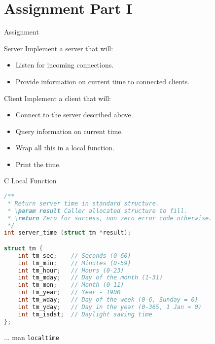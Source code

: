 \section{Assignment Part I}


\begin{frame}{Assignment}
    \begin{block}{Server}
        Implement a server that will:
        \begin{itemize}
            \item Listen for incoming connections.
            \item Provide information on current time to connected clients.
        \end{itemize}
    \end{block}

    \bigskip

    \begin{block}{Client}
        Implement a client that will:
        \begin{itemize}
            \item Connect to the server described above.
            \item Query information on current time.
            \item Wrap all this in a local function.
            \item Print the time.
        \end{itemize}
    \end{block}
\end{frame}


\begin{frame}[fragile]{C Local Function}
\begin{lstlisting}[language=c,style=mini]
/**
 * Return server time in standard structure.
 * \param result Caller allocated structure to fill.
 * \return Zero for success, non zero error code otherwise.
 */
int server_time (struct tm *result);

struct tm {
    int tm_sec;    // Seconds (0-60)
    int tm_min;    // Minutes (0-59)
    int tm_hour;   // Hours (0-23)
    int tm_mday;   // Day of the month (1-31)
    int tm_mon;    // Month (0-11)
    int tm_year;   // Year - 1900
    int tm_wday;   // Day of the week (0-6, Sunday = 0)
    int tm_yday;   // Day in the year (0-365, 1 Jan = 0)
    int tm_isdst;  // Daylight saving time
};
\end{lstlisting}
    \hfill ... man \lstinline{localtime}
\end{frame}


